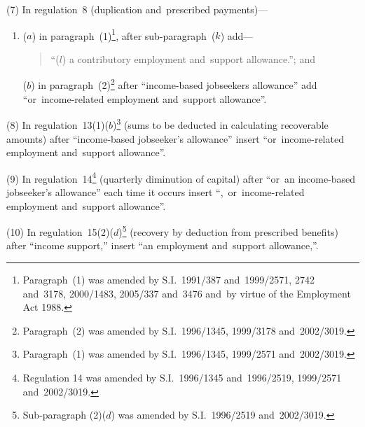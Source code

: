 \documentclass[12pt,a4paper]{article}
\begin{document}
(7) In regulation~8 (duplication and~prescribed payments)—
\begin{enumerate}\item[]
($a$) in paragraph~(1)\footnote{Paragraph~(1) was amended by S.I.~1991/387 and~1999/2571, 2742 and~3178, 2000/1483, 2005/337 and~3476 and~by virtue of the Employment Act 1988.}, after sub-paragraph~($k$)  add—
\begin{quotation}
“($l$) a contributory employment and~support allowance.”; and
\end{quotation}

($b$) in paragraph~(2)\footnote{Paragraph~(2) was amended by S.I.~1996/1345, 1999/3178 and~2002/3019.} after “income-based jobseekers allowance” add “or~income-related employment and~support allowance”.
\end{enumerate}

(8) In regulation~13(1)($b$)\footnote{Paragraph~(1) was amended by S.I.~1996/1345, 1999/2571 and~2002/3019.} (sums to be deducted in calculating recoverable amounts) after “income-based jobseeker’s allowance” insert “or~income-related employment and~support allowance”.

(9) In regulation~14\footnote{Regulation 14 was amended by S.I.~1996/1345 and~1996/2519, 1999/2571 and~2002/3019.} (quarterly diminution of capital) after “or~an income-based jobseeker’s allowance” each time it occurs insert “,~or~income-related employment and~support allowance”.

(10) In regulation~15(2)($d$)\footnote{Sub-paragraph (2)($d$) was amended by S.I.~1996/2519 and~2002/3019.} (recovery by deduction from prescribed benefits) after “income support,” insert “an employment and~support allowance,”.
\end{document}
